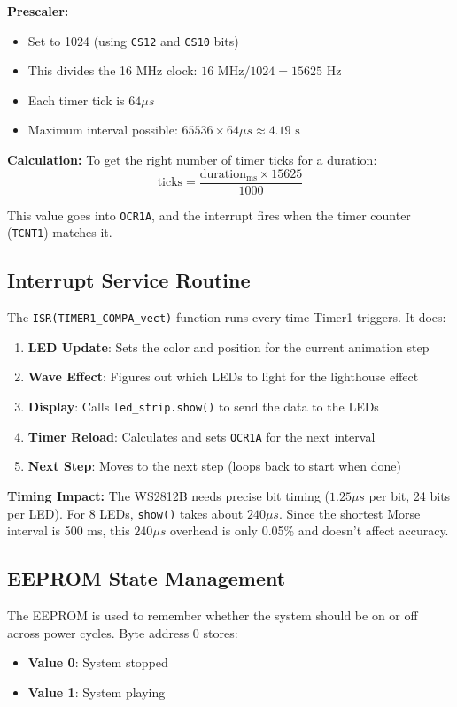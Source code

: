 \documentclass[report]{IEEEtran}
\begin{document}
\textbf{Prescaler:}
\begin{itemize}
    \item Set to 1024 (using \texttt{CS12} and \texttt{CS10} bits)
    \item This divides the 16 MHz clock: $16\text{ MHz} / 1024 = 15625\text{ Hz}$
    \item Each timer tick is $64\mu s$
    \item Maximum interval possible: $65536 \times 64\mu s \approx 4.19\text{ s}$
\end{itemize}

\textbf{Calculation:}
To get the right number of timer ticks for a duration:
$$\text{ticks} = \frac{\text{duration}_{\text{ms}} \times 15625}{1000}$$

This value goes into \texttt{OCR1A}, and the interrupt fires when the timer counter (\texttt{TCNT1}) matches it.

\subsection{Interrupt Service Routine}
The \texttt{ISR(TIMER1\_COMPA\_vect)} function runs every time Timer1 triggers. It does:
\begin{enumerate}
    \item \textbf{LED Update}: Sets the color and position for the current animation step
    \item \textbf{Wave Effect}: Figures out which LEDs to light for the lighthouse effect
    \item \textbf{Display}: Calls \texttt{led\_strip.show()} to send the data to the LEDs
    \item \textbf{Timer Reload}: Calculates and sets \texttt{OCR1A} for the next interval
    \item \textbf{Next Step}: Moves to the next step (loops back to start when done)
\end{enumerate}

\textbf{Timing Impact:}
The WS2812B needs precise bit timing ($1.25\mu s$ per bit, 24 bits per LED). For 8 LEDs, \texttt{show()} takes about $240\mu s$. Since the shortest Morse interval is 500 ms, this $240\mu s$ overhead is only 0.05\% and doesn't affect accuracy.

\subsection{EEPROM State Management}
The EEPROM is used to remember whether the system should be on or off across power cycles. Byte address 0 stores:
\begin{itemize}
    \item \textbf{Value 0}: System stopped
    \item \textbf{Value 1}: System playing
\end{itemize}
\end{document}
